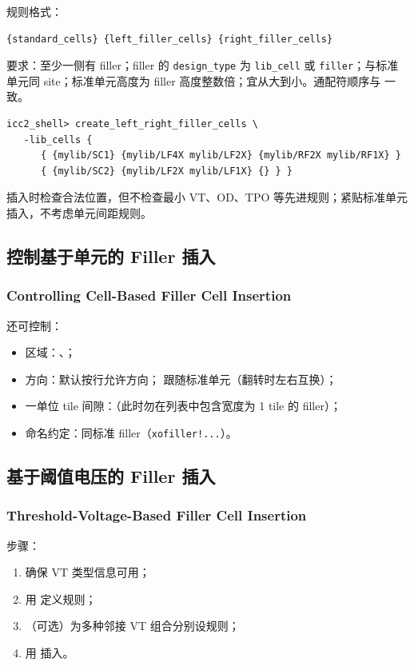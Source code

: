  规则格式：
\begin{lstlisting}
{standard_cells} {left_filler_cells} {right_filler_cells}
\end{lstlisting}

要求：至少一侧有 filler；filler 的 \texttt{design\_type} 为 \texttt{lib\_cell} 或 \texttt{filler}；与标准单元同 site；标准单元高度为 filler 高度整数倍；宜从大到小。通配符顺序与  一致。

\begin{lstlisting}
icc2_shell> create_left_right_filler_cells \
   -lib_cells {
      { {mylib/SC1} {mylib/LF4X mylib/LF2X} {mylib/RF2X mylib/RF1X} }
      { {mylib/SC2} {mylib/LF2X mylib/LF1X} {} } }
\end{lstlisting}

插入时检查合法位置，但不检查最小 VT、OD、TPO 等先进规则；紧贴标准单元插入，不考虑单元间距规则。

\subsection{控制基于单元的 Filler 插入}
\subsubsection*{Controlling Cell-Based Filler Cell Insertion}

 还可控制：
\begin{itemize}
  \item 区域：、；
  \item 方向：默认按行允许方向； 跟随标准单元（翻转时左右互换）；
  \item 一单位 tile 间隙：\opt{-rules no\_1x}（此时勿在列表中包含宽度为 1 tile 的 filler）；
  \item 命名约定：同标准 filler（\texttt{xofiller!...}）。
\end{itemize}

\subsection{基于阈值电压的 Filler 插入}
\subsubsection*{Threshold-Voltage-Based Filler Cell Insertion}

步骤：
\begin{enumerate}
  \item 确保 VT 类型信息可用；
  \item 用  定义规则；
  \item （可选）为多种邻接 VT 组合分别设规则；
  \item 用  插入。
\end{enumerate}

